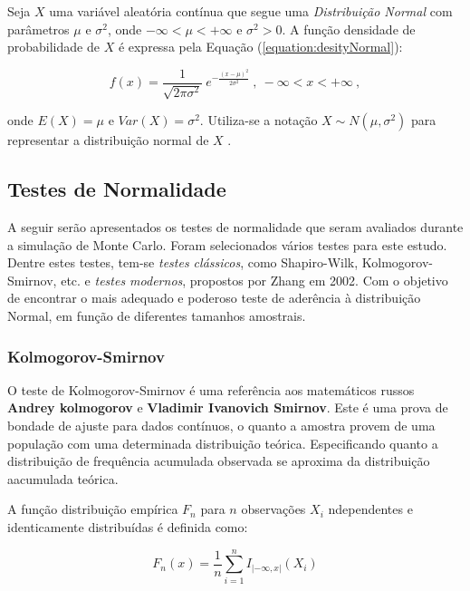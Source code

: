 \documentclass[a4paper,11pt]{article} %
\begin{document}
Seja $X$ uma variável aleatória contínua que segue uma \textit{Distribuição Normal} com parâmetros $\mu$ e $\sigma^{2}$, onde $- \infty < \mu < +\infty$ e $\sigma^{2} > 0$. A função densidade de probabilidade de $X$ é expressa pela Equação (\ref{equation:desityNormal}):

\begin{equation}
    f(x) = \dfrac{1}{\sqrt{2 \pi \sigma^2}} \ e^{{- \frac{(x - \mu)^{2}}{2 \sigma^2}}} \ , \ - \infty < x < +\infty \ ,
    \label{equation:desityNormal}
\end{equation}

\noindent onde $E(X) = \mu$ e $Var(X) = \sigma^{2}$. Utiliza-se a notação $X \sim N(\mu, \sigma^{2})$ para representar a distribuição normal de $X$ \cite{bussab2010estatistica}.

\subsection{Testes de Normalidade} \label{section:tests_norm} %

A seguir serão apresentados os testes de normalidade que seram avaliados durante a simulação de Monte Carlo. Foram selecionados vários testes para este estudo. Dentre estes testes, tem-se \textit{testes clássicos}, como Shapiro-Wilk, Kolmogorov-Smirnov, etc. e \textit{testes modernos}, propostos por Zhang em 2002. Com o objetivo de encontrar o mais adequado e poderoso teste de aderência à distribuição Normal, em função de diferentes tamanhos amostrais.

\subsubsection{Kolmogorov-Smirnov}

O teste de Kolmogorov-Smirnov é uma referência aos matemáticos russos \textbf{Andrey kolmogorov} e \textbf{Vladimir Ivanovich Smirnov}. Este é uma prova de bondade de ajuste para dados contínuos, o quanto a amostra provem de uma população com uma determinada distribuição teórica. Especificando quanto a distribuição de frequência acumulada observada se aproxima da distribuição aacumulada teórica.\vskip0.3cm

A função distribuição empírica $F_{n}$ para $n$ observações $X_{i}$ ndependentes e identicamente distribuídas é definida como:

\begin{equation}
    F_{n}(x) = \frac{1}{n} \sum_{i=1}^{n}I_{|- \infty, x|}(X_{i})
\end{equation}
\end{document}
